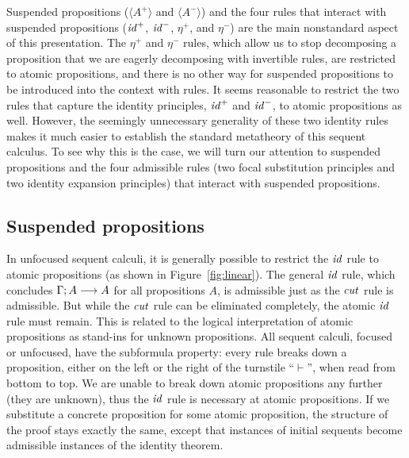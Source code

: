 Suspended propositions ($\langle A^+ \rangle$ and $\langle A^-
\rangle$) and the four rules that interact with suspended propositions
(${\it id}^+$, ${\it id}^-$, $\eta^+$, and $\eta^-$) are the main
nonstandard aspect of this presentation.  The $\eta^+$ and $\eta^-$
rules, which allow us to stop decomposing a proposition that we are
eagerly decomposing with invertible rules, are restricted to atomic
propositions, and there is no other way for suspended propositions to
be introduced into the context with rules. It seems reasonable to
restrict the two rules that capture the identity principles, ${\it
  id}^+$ and ${\it id}^-$, to atomic propositions as well.  However,
the seemingly unnecessary generality of these two identity rules makes
it much easier to establish the standard metatheory of this sequent
calculus. To see why this is the case, we will turn our attention to
suspended propositions and the four admissible rules (two focal
substitution principles and two identity expansion principles) that
interact with suspended propositions.


\subsection{Suspended propositions}
\label{sec:lin-suspended}

In unfocused sequent calculi, it is generally possible to restrict the
${\it id}$ rule to atomic propositions (as shown in
Figure~\ref{fig:linear}). The general ${\it id}$ rule,
which concludes ${\Gamma};{A} \longrightarrow {A} \mathstrut$ for all propositions $A$, is
admissible just as the ${\it cut}$ rule is admissible. But while the
${\it cut}$ rule can be eliminated completely, the atomic ${\it id}$
rule must remain. This is related to the logical interpretation of
atomic propositions as stand-ins for unknown propositions.  All
sequent calculi, focused or unfocused, have the subformula property:
every rule breaks down a proposition, either on the left or the right
of the turnstile ``$\vdash$'', when read from bottom to top. We are
unable to break down atomic propositions any further (they are
unknown), thus the ${\it id}$ rule is necessary at atomic
propositions.  If we substitute a concrete proposition for some atomic
proposition, the structure of the proof stays exactly the same, except
that instances of initial sequents become admissible instances of the
identity theorem.

